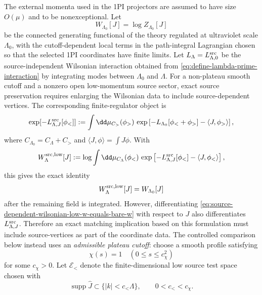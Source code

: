 The external momenta used in the 1PI projectors are assumed to have size
\(O(\mu)\) and to be nonexceptional.  Let
\[
  W_{\Lambda_0}[J]=\log Z_{\Lambda_0}[J]
\]
be the connected generating functional of the theory regulated at ultraviolet
scale \(\Lambda_0\), with the cutoff-dependent local terms in the
path-integral Lagrangian chosen so that the selected 1PI coordinates have
finite limits.
Let \(L_\Lambda=L_{\Lambda,0}^{\rm src}\) be the source-independent Wilsonian
interaction obtained from \eqref{eq:define-lambda-prime-interaction} by
integrating modes between \(\Lambda_0\) and \(\Lambda\).  For a non-plateau
smooth cutoff and a nonzero open low-momentum source sector, exact source
preservation requires enlarging the Wilsonian data to include
source-dependent vertices.  The corresponding finite-regulator object is
\begin{equation}
  \exp[-L_{\Lambda,J}^{\rm src}[\phi_<]]
  :=
  \int\dd\mu_{C_>}(\phi_>)\,
  \exp\left[-L_{\Lambda_0}[\phi_<+\phi_>]
  -\langle J,\phi_>\rangle\right],
  \label{eq:source-dependent-wilsonian-action}
\end{equation}
where \(C_{\Lambda_0}=C_\Lambda+C_>\) and
\(\langle J,\phi\rangle=\int J\phi\).  With
\[
  W_{\Lambda}^{\rm src,low}[J]
  :=
  \log
  \int\dd\mu_{C_\Lambda}(\phi_<)\,
  \exp\left[
    -L_{\Lambda,J}^{\rm src}[\phi_<]
    -\langle J,\phi_<\rangle
  \right],
\]
this gives the exact identity
\begin{equation}
  W_{\Lambda}^{\rm src,low}[J]=W_{\Lambda_0}[J]
  \label{eq:source-dependent-wilsonian-low-w-equals-bare-w}
\end{equation}
after the remaining field is integrated.  However, differentiating
\eqref{eq:source-dependent-wilsonian-low-w-equals-bare-w} with respect to
\(J\) also differentiates \(L_{\Lambda,J}^{\rm src}\).  Therefore an exact
matching implication based on this formulation must include source-vertices as
part of the coordinate data.  The controlled comparison below instead uses an
\emph{admissible plateau cutoff}: choose a smooth profile satisfying
\begin{equation}
  \chi(s)=1\quad(0\le s\le c_\chi^2)
  \label{eq:admissible-plateau-cutoff}
\end{equation}
for some \(c_\chi>0\).  Let \(\mathcal E_<\) denote the finite-dimensional low
source test space chosen with
\begin{equation}
  \operatorname{supp}\widehat J\subset\{|k|<c_<\Lambda\},
  \qquad
  0<c_< < c_\chi .
  \label{eq:low-source-plateau-support}
\end{equation}
